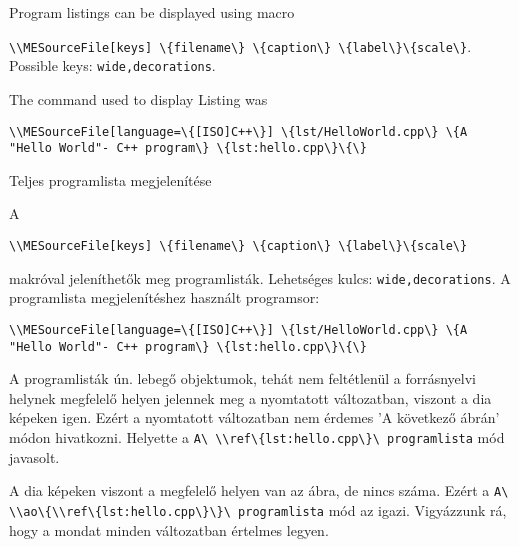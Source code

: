
{

Program listings can be displayed using macro
\par\noindent\lstinline|\\MESourceFile[keys] \{filename\} \{caption\} \{label\}\{scale\}|.
Possible keys: \lstinline|wide,decorations|.


\par\noindent The command used to display Listing\ao{~\ref{lst:hello.cpp}} was
\par\noindent\lstinline|\\MESourceFile[language=\{[ISO]C++\}] \{lst/HelloWorld.cpp\} \{A "Hello World"- C++ program\} \{lst:hello.cpp\}\{\}|

}
{Teljes programlista megjelenítése}
{
A
\par\noindent\lstinline|\\MESourceFile[keys] \{filename\} \{caption\} \{label\}\{scale\}|
\par\noindent makróval jeleníthetők meg programlisták.
Lehetséges kulcs: \lstinline|wide,decorations|.
A \ao{\ref{lst:hello.cpp}} programlista megjelenítéshez használt programsor:
\par\noindent\lstinline|\\MESourceFile[language=\{[ISO]C++\}] \{lst/HelloWorld.cpp\} \{A "Hello World"- C++ program\} \{lst:hello.cpp\}\{\}|



A programlisták ún. lebegő objektumok, tehát nem feltétlenül a forrásnyelvi helynek 
megfelelő helyen jelennek meg a nyomtatott változatban, viszont a dia képeken igen.
Ezért a nyomtatott változatban nem érdemes 'A következő ábrán' módon hivatkozni. Helyette
a \lstinline|A\ \\ref\{lst:hello.cpp\}\ programlista| mód javasolt.

A dia képeken viszont  a megfelelő helyen van az ábra, de nincs száma.
Ezért a \lstinline|A\ \\ao\{\\ref\{lst:hello.cpp\}\}\ programlista| mód az igazi.
Vigyázzunk rá, hogy a mondat minden változatban értelmes legyen.
}

